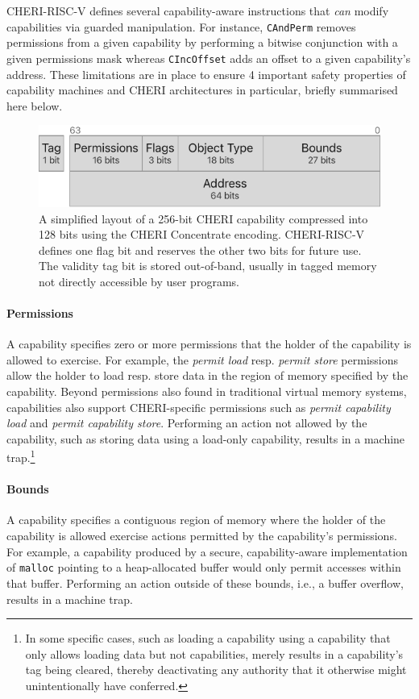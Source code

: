 \documentclass[main.tex]{subfiles}
\begin{document}
CHERI-RISC-V defines several capability-aware instructions that \emph{can} modify capabilities via guarded manipulation. For instance, \texttt{CAndPerm} removes permissions from a given capability by performing a bitwise conjunction with a given permissions mask whereas \texttt{CIncOffset} adds an offset to a given capability's address. These limitations are in place to ensure 4 important safety properties of capability machines and CHERI architectures in particular, briefly summarised here below.

\begin{figure}
	\centering
	\includegraphics{Images/CHERI Concentrate Layout.pdf}
	\caption{A simplified layout of a 256-bit CHERI capability compressed into 128 bits using the CHERI Concentrate encoding. CHERI-RISC-V defines one flag bit and reserves the other two bits for future use. The validity tag bit is stored out-of-band, usually in tagged memory not directly accessible by user programs.}
	\label{fig:chericoncentrate}
\end{figure}

\paragraph{Permissions} A capability specifies zero or more permissions that the holder of the capability is allowed to exercise. For example, the \emph{permit load} resp. \emph{permit store} permissions allow the holder to load resp. store data in the region of memory specified by the capability. Beyond permissions also found in traditional virtual memory systems, capabilities also support CHERI-specific permissions such as \emph{permit capability load} and \emph{permit capability store}. Performing an action not allowed by the capability, such as storing data using a load-only capability, results in a machine trap.\footnote{In some specific cases, such as loading a capability using a capability that only allows loading data but not capabilities, merely results in a capability's tag being cleared, thereby deactivating any authority that it otherwise might unintentionally have conferred.}

\paragraph{Bounds} A capability specifies a contiguous region of memory where the holder of the capability is allowed exercise actions permitted by the capability's permissions. For example, a capability produced by a secure, capability-aware implementation of \texttt{malloc} pointing to a heap-allocated buffer would only permit accesses within that buffer. Performing an action outside of these bounds, i.e., a buffer overflow, results in a machine trap.
\end{document}
